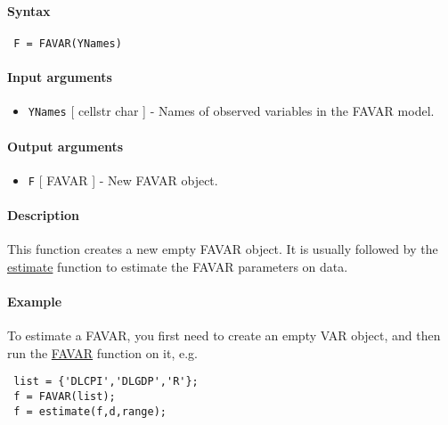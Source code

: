 


	\paragraph{Syntax}
 
 \begin{verbatim}
 F = FAVAR(YNames)
 \end{verbatim}
 
 \paragraph{Input arguments}
 
 \begin{itemize}
 \item
   \texttt{YNames} {[} cellstr \textbar{} char {]} - Names of observed
   variables in the FAVAR model.
 \end{itemize}
 
 \paragraph{Output arguments}
 
 \begin{itemize}
 \item
   \texttt{F} {[} FAVAR {]} - New FAVAR object.
 \end{itemize}
 
 \paragraph{Description}
 
 This function creates a new empty FAVAR object. It is usually followed
 by the \href{FAVAR/estimate}{estimate} function to estimate the FAVAR
 parameters on data.
 
 \paragraph{Example}
 
 To estimate a FAVAR, you first need to create an empty VAR object, and
 then run the \href{FAVAR/estimate}{FAVAR} function on it, e.g.
 
 \begin{verbatim}
 list = {'DLCPI','DLGDP','R'};
 f = FAVAR(list);
 f = estimate(f,d,range);
 \end{verbatim}


